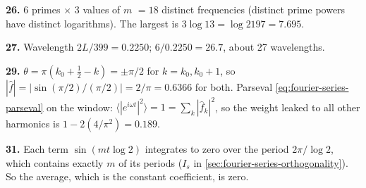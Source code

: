\textbf{26.} $6$ primes $\times$ $3$ values of $m$ $=18$ distinct frequencies (distinct prime powers have distinct logarithms). The largest is $3\log13=\log2197=7.695$.

\textbf{27.} Wavelength $2L/399=0.2250$; $6/0.2250=26.7$, about 27 wavelengths.

\textbf{29.} $\theta=\pi(k_0+\tfrac12-k)=\pm\pi/2$ for $k=k_0,k_0+1$, so $|\hat f|=|\sin(\pi/2)/(\pi/2)|=2/\pi=0.6366$ for both. Parseval \cref{eq:fourier-series-parseval} on the window: $\langle|e^{i\omega t}|^2\rangle=1=\sum_k|\hat f_k|^2$, so the weight leaked to all other harmonics is $1-2(4/\pi^2)=0.189$.

\textbf{31.} Each term $\sin(mt\log2)$ integrates to zero over the period $2\pi/\log2$, which contains exactly $m$ of its periods ($I_s$ in \cref{sec:fourier-series-orthogonality}). So the average, which is the constant coefficient, is zero.
